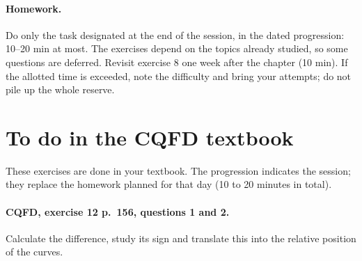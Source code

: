\paragraph{Homework.} Do only the task designated at the end of the session, in the dated progression: 10--20 min at most. The exercises depend on the topics already studied, so some questions are deferred. Revisit exercise 8 one week after the chapter (10 min). If the allotted time is exceeded, note the difficulty and bring your attempts; do not pile up the whole reserve.
\endgroup
{}\section*{To do in the CQFD textbook}
These exercises are done in your textbook. The progression indicates the session; they replace the homework planned for that day (10 to 20 minutes in total).
\paragraph{CQFD, exercise 12 p.~156, questions 1 and 2.}\label{C06-M1} Calculate the difference, study its sign and translate this into the relative position of the curves.
